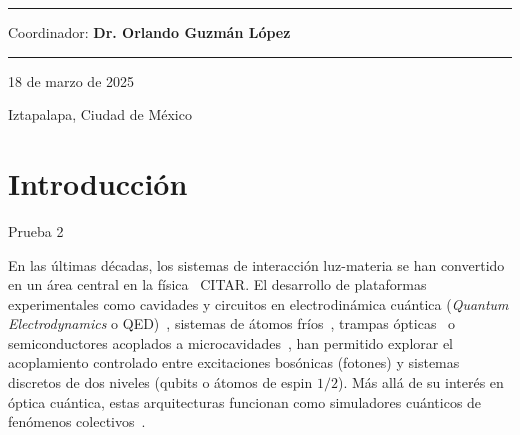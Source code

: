 \documentclass[onecolumn,notitlepage,letterpaper,aps,pra,12pt]{article}
\numberwithin{equation}{section}
\begin{document}
\begin{titlepage}
\vspace{1cm}
\rule{5cm}{0.3mm}

\vspace{0.45cm}
{\large Coordinador: \textbf{Dr. Orlando Guzmán López}  \par}

{\LARGE \rule{15cm}{1.0mm}  \par}

\vspace{0.4cm}

{\large 18 de marzo de 2025 \par}
\vspace{0.1cm}
{\large Iztapalapa, Ciudad de México \par}
\end{titlepage}

\clearpage
\tableofcontents
\clearpage
\newpage



\section{Introducción}

Prueba 2

En las últimas décadas, los sistemas de interacción luz-materia se han convertido en un área central en la física~\cite{haroche2006} CITAR. El desarrollo de plataformas experimentales como cavidades y circuitos en electrodinámica cuántica (\textit{Quantum Electrodynamics} o QED)~\cite{Blais2021,Clerk2020}, sistemas de átomos fríos~\cite{Mekhov2012}, trampas ópticas~\cite{Yuanjie2021} o semiconductores acoplados a microcavidades~\cite{Schneider2018}, han permitido explorar el acoplamiento controlado entre excitaciones bosónicas (fotones) y sistemas discretos de dos niveles (qubits o átomos de espin $1/2$). Más allá de su interés en óptica cuántica, estas arquitecturas  funcionan como simuladores cuánticos de fenómenos colectivos~\cite{caballero2016}.
\end{document}
